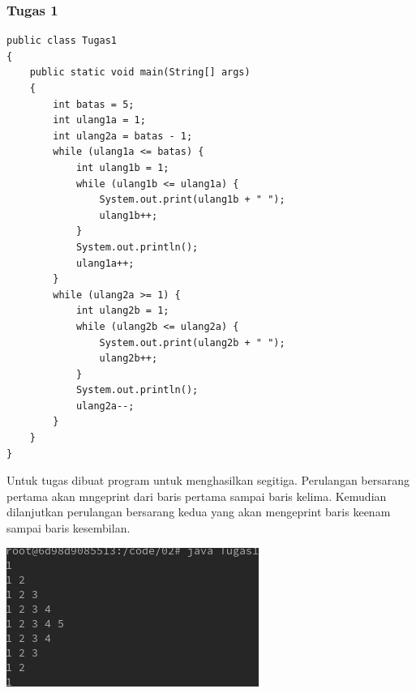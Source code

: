 \documentclass[a4paper,12pt]{article}
\begin{document}
\subsubsection{Tugas 1}
\begin{center}
    \begin{lstlisting}
public class Tugas1
{
    public static void main(String[] args)
    {
        int batas = 5;
        int ulang1a = 1;
        int ulang2a = batas - 1;
        while (ulang1a <= batas) {
            int ulang1b = 1;
            while (ulang1b <= ulang1a) {
                System.out.print(ulang1b + " ");
                ulang1b++;
            }
            System.out.println();
            ulang1a++;
        }
        while (ulang2a >= 1) {
            int ulang2b = 1;
            while (ulang2b <= ulang2a) {
                System.out.print(ulang2b + " ");
                ulang2b++;
            }
            System.out.println();
            ulang2a--;
        }
    }
}
    \end{lstlisting}
\end{center}
Untuk tugas dibuat program untuk menghasilkan segitiga. Perulangan bersarang pertama akan mngeprint dari baris pertama sampai baris kelima. Kemudian dilanjutkan 
perulangan bersarang kedua yang akan mengeprint baris keenam sampai baris kesembilan.
\begin{center}
    \includegraphics[scale=.7]{tugas1.png}
\end{center}
\end{document}
